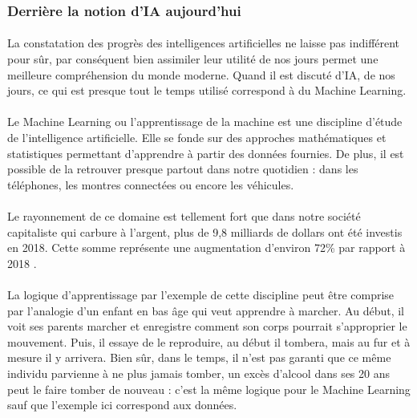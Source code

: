 \documentclass[10pt, french, a4paper]{article}
\begin{document}
\subsubsection{Derrière la notion d'IA aujourd’hui}
\label{subsubsection:ia_auj}

\paragraph{}
La constatation des progrès des intelligences artificielles ne laisse pas indifférent pour sûr, par conséquent bien assimiler leur utilité de nos jours permet une meilleure compréhension du monde moderne. Quand il est discuté d'IA, de nos jours, ce qui est presque tout le temps utilisé correspond à du Machine Learning.

\paragraph{}
Le Machine Learning ou l'apprentissage de la machine est une discipline d'étude de l'intelligence artificielle. Elle se fonde sur des approches mathématiques et statistiques permettant d'apprendre à partir des données fournies. De plus, il est possible de la retrouver presque partout dans notre quotidien : dans les téléphones, les montres connectées ou encore les véhicules.

\paragraph{}
Le rayonnement de ce domaine est tellement fort que dans notre société capitaliste qui carbure à l'argent, plus de 9,8 milliards de dollars ont été investis en 2018. Cette somme représente une augmentation d'environ 72\% par rapport à 2018 \citep{columbus_25_2019}.

\paragraph{}
La logique d'apprentissage par l'exemple de cette discipline peut être comprise par l'analogie d'un enfant en bas âge qui veut apprendre à marcher. Au début, il voit ses parents marcher et enregistre comment son corps pourrait s'approprier le mouvement. Puis, il essaye de le reproduire, au début il tombera, mais au fur et à mesure il y arrivera. Bien sûr, dans le temps, il n'est pas garanti que ce même individu parvienne à ne plus jamais tomber, un excès d'alcool dans ses 20 ans peut le faire tomber de nouveau : c'est la même logique pour le Machine Learning sauf que l'exemple ici correspond aux données.
\end{document}
